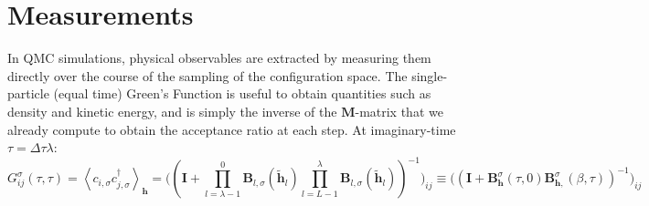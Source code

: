 \section{Measurements}
\label{subsec:measurements}

In QMC simulations, physical observables are extracted by measuring them directly over the course of the sampling of the  configuration space. The single-particle (equal time) Green's Function is useful to obtain quantities such as density and kinetic energy, and is simply the inverse of the $\bm M$-matrix that we already compute to obtain the acceptance ratio at each step.
At imaginary-time $\tau = \Delta \tau \lambda$: 
\begin{equation}\label{eq:eqG}
G_{ij}^\sigma ( \tau, \tau) = \left\langle c_{i,\sigma} c_{j,\sigma}^\dagger \right\rangle_{\bm h} = \bigg( (\bm I + \prod_{l= \lambda - 1}^0 \bm B_{l,\sigma} ( \widetilde{\bm h}_l ) \prod_{l= L -1}^\lambda \bm B_{l,\sigma} ( \widetilde{\bm h}_l )  )^{-1} \bigg)_{ij} \equiv \bigg( (\bm I + \bm B_{\bm h}^\sigma (\tau, 0) \bm B_{\bm h, }^\sigma (\beta, \tau)  )^{-1} \bigg)_{ij}
\end{equation}

